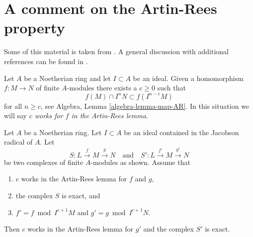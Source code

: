 \section{A comment on the Artin-Rees property}
\label{section-artin-rees}

\noindent
Some of this material is taken from \cite{conrad-dejong}. A general
discussion with additional references can be found in
\cite[Section 1]{Eis}.

\medskip\noindent
Let $A$ be a Noetherian ring and let $I \subset A$ be an ideal. Given a
homomorphism $f : M \to N$ of finite $A$-modules there exists a $c \geq 0$
such that
$$
f(M) \cap I^nN \subset f(I^{n - c}M)
$$
for all $n \geq c$, see Algebra, Lemma \ref{algebra-lemma-map-AR}. In this
situation we will say {\it $c$ works for $f$ in the Artin-Rees lemma}.

\begin{lemma}
\label{lemma-approximate-complex}
Let $A$ be a Noetherian ring. Let $I \subset A$ be an ideal contained in
the Jacobson radical of $A$. Let
$$
S : L \xrightarrow{f} M \xrightarrow{g} N
\quad\text{and}\quad
S' : L \xrightarrow{f'} M \xrightarrow{g'} N
$$
be two complexes of finite $A$-modules as shown. Assume that
\begin{enumerate}
\item $c$ works in the Artin-Rees lemma for $f$ and $g$,
\item the complex $S$ is exact, and
\item $f' = f \bmod I^{c + 1}M$ and $g' = g \bmod I^{c + 1}N$.
\end{enumerate}
Then $c$ works in the Artin-Rees lemma for $g'$ and the
complex $S'$ is exact.
\end{lemma}


